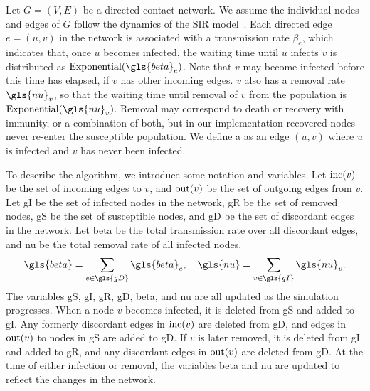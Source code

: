 Let $G = (V, E)$ be a directed contact network. We assume the individual nodes
and edges of $G$ follow the dynamics of the \gls{SIR}
model~\autocite{kermack1927contribution}. Each directed edge $e = (u, v)$ in
the network is associated with a transmission rate $\beta_e$, which indicates
that, once $u$ becomes infected, the waiting time until $u$ infects $v$ is
distributed as $\Exponential(\gls{beta}_e)$. Note that $v$ may become infected
before this time has elapsed, if $v$ has other incoming edges. $v$ also has a
removal rate $\gls{nu}_v$, so that the waiting time until removal of $v$ from
the population is $\Exponential(\gls{nu}_v)$. Removal may correspond to death
or recovery with immunity, or a combination of both, but in our implementation
recovered nodes never re-enter the susceptible population. We define a
 as an edge $(u, v)$ where $u$ is infected and $v$ has
never been infected. 

To describe the algorithm, we introduce some notation and variables. Let
$\operatorname{inc}(v)$ be the set of incoming edges to $v$, and $\operatorname{out}(v)$ be the set of
outgoing edges from $v$. Let \gls{gI} be the set of infected nodes in the
network, \gls{gR} be the set of removed nodes, \gls{gS} be the set of
susceptible nodes, and \gls{gD} be the set of discordant edges in the network.
Let \gls{beta} be the total transmission rate over all discordant edges, and
\gls{nu} be the total removal rate of all infected nodes,
\[
    \gls{beta} = \sum_{e \in \gls{gD}} \gls{beta}_e, \quad
    \gls{nu} = \sum_{v \in \gls{gI}} \gls{nu}_v.
\]
The variables \gls{gS}, \gls{gI}, \gls{gR}, \gls{gD}, \gls{beta}, and \gls{nu}
are all updated as the simulation progresses. When a node $v$ becomes infected,
it is deleted from \gls{gS} and added to \gls{gI}. Any formerly discordant
edges in $\operatorname{inc}(v)$ are deleted from \gls{gD}, and edges in $\operatorname{out}(v)$ to nodes
in \gls{gS} are added to \gls{gD}. If $v$ is later removed, it is deleted from
\gls{gI} and added to \gls{gR}, and any discordant edges in $\operatorname{out}(v)$ are
deleted from \gls{gD}. At the time of either infection or removal, the
variables \gls{beta} and \gls{nu} are updated to reflect the changes in the
network. 

